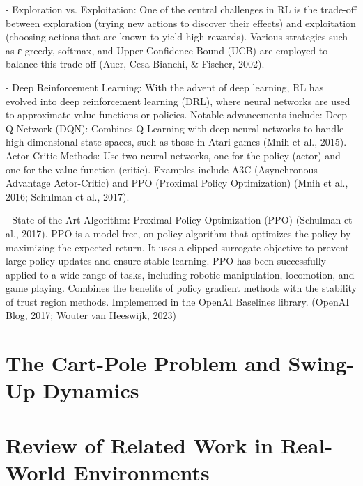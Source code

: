 - Exploration vs. Exploitation: One of the central challenges in RL is the trade-off between exploration (trying new actions to discover their effects) and exploitation (choosing actions that are known to yield high rewards). Various strategies such as ε-greedy, softmax, and Upper Confidence Bound (UCB) are employed to balance this trade-off (Auer, Cesa-Bianchi, & Fischer, 2002).

- Deep Reinforcement Learning: With the advent of deep learning, RL has evolved into deep reinforcement learning (DRL), where neural networks are used to approximate value functions or policies. Notable advancements include: Deep Q-Network (DQN): Combines Q-Learning with deep neural networks to handle high-dimensional state spaces, such as those in Atari games (Mnih et al., 2015). Actor-Critic Methods: Use two neural networks, one for the policy (actor) and one for the value function (critic). Examples include A3C (Asynchronous Advantage Actor-Critic) and PPO (Proximal Policy Optimization) (Mnih et al., 2016; Schulman et al., 2017).

- State of the Art Algorithm: Proximal Policy Optimization (PPO) (Schulman et al., 2017). PPO is a model-free, on-policy algorithm that optimizes the policy by maximizing the expected return. It uses a clipped surrogate objective to prevent large policy updates and ensure stable learning. PPO has been successfully applied to a wide range of tasks, including robotic manipulation, locomotion, and game playing. Combines the benefits of policy gradient methods with the stability of trust region methods. Implemented in the OpenAI Baselines library. (OpenAI Blog, 2017; Wouter van Heeswijk, 2023)

\section{The Cart-Pole Problem and Swing-Up Dynamics}

\section{Review of Related Work in Real-World Environments}